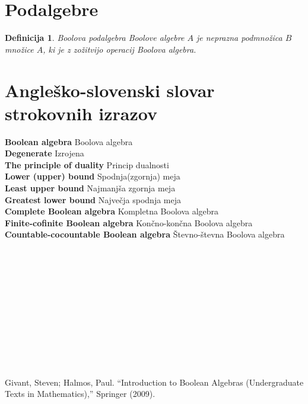 \documentclass{amsart}
\newcommand{\geslo}[2]{\noindent\textbf{#1} \quad \hangindent=1cm #2\\[-1pc]}
\newtheorem{definicija}[izrek]{Definicija}
\begin{document}


\section{Podalgebre}

\begin{definicija}
    Boolova podalgebra Boolove algebre $A$ je neprazna podmnožica $B$ množice $A$, ki je z zožitvijo operacij Boolova algebra.

\end{definicija}

















\newpage
\section*{Angleško-slovenski slovar strokovnih izrazov}


\geslo{Boolean algebra}{Boolova algebra}

\geslo{Degenerate}{Izrojena}

\geslo{The principle of duality}{Princip dualnosti}

\geslo{Lower (upper) bound}{Spodnja(zgornja) meja}

\geslo{Least upper bound}{Najmanjša zgornja meja}

\geslo{Greatest lower bound}{Največja spodnja meja}

\geslo{Complete Boolean algebra}{Kompletna Boolova algebra}

\geslo{Finite-cofinite Boolean algebra}{Končno-končna Boolova algebra}

\geslo{Countable-cocountable Boolean algebra}{Števno-števna Boolova algebra}

\geslo{}{}

\geslo{}{}

\geslo{}{}

\geslo{}{}

\geslo{}{}

\geslo{}{}

\geslo{}{}

\geslo{}{}

\geslo{}{}

\geslo{}{}


\geslo{}{}






\begin{thebibliography}{1}
Givant, Steven; Halmos, Paul. “Introduction to Boolean Algebras (Undergraduate Texts in Mathematics),” Springer (2009).
\end{thebibliography}
\end{document}
